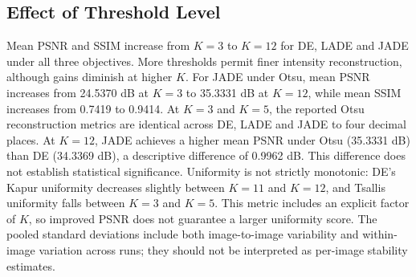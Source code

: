 \documentclass[review]{elsarticle}
\begin{document}
\begin{table}[htbp]
\centering
\small
\caption{Uniformity on BSD500 using Tsallis ($q=0.8$): pooled mean $\pm$ sample standard deviation across 300 observations per entry (10 images, 30 runs each).}
\label{tab:bsd-tsallis-uniformity}
\end{table}

\clearpage

\subsection{Effect of Threshold Level}

Mean PSNR and SSIM increase from $K=3$ to $K=12$ for DE, LADE and JADE under all three objectives. More thresholds permit finer intensity reconstruction, although gains diminish at higher $K$. For JADE under Otsu, mean PSNR increases from 24.5370 dB at $K=3$ to 35.3331 dB at $K=12$, while mean SSIM increases from 0.7419 to 0.9414. At $K=3$ and $K=5$, the reported Otsu reconstruction metrics are identical across DE, LADE and JADE to four decimal places. At $K=12$, JADE achieves a higher mean PSNR under Otsu (35.3331 dB) than DE (34.3369 dB), a descriptive difference of 0.9962 dB. This difference does not establish statistical significance. Uniformity is not strictly monotonic: DE's Kapur uniformity decreases slightly between $K=11$ and $K=12$, and Tsallis uniformity falls between $K=3$ and $K=5$. This metric includes an explicit factor of $K$, so improved PSNR does not guarantee a larger uniformity score. The pooled standard deviations include both image-to-image variability and within-image variation across runs; they should not be interpreted as per-image stability estimates.
\end{document}
